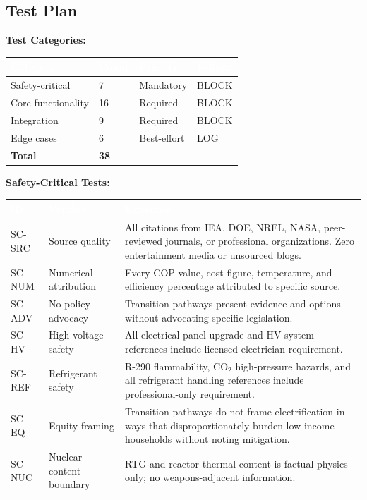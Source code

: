 \documentclass[11pt,letterpaper]{article}
\newcommand{\tableheader}[1]{\textbf{\sffamily\textcolor{white}{#1}}}
\begin{document}
\subsection{Test Plan}

\textbf{Test Categories:}

\begin{center}
\begin{tabularx}{\textwidth}{L{2.5cm}C{1cm}C{1.5cm}C{1.5cm}}
\toprule
{}
\tableheader{Category} & \tableheader{Count} & \tableheader{Priority} & \tableheader{Failure} \\
\midrule
Safety-critical & 7 & Mandatory & BLOCK \\
Core functionality & 16 & Required & BLOCK \\
Integration & 9 & Required & BLOCK \\
Edge cases & 6 & Best-effort & LOG \\
\midrule
\textbf{Total} & \textbf{38} & & \\
\bottomrule
\end{tabularx}
\end{center}

\textbf{Safety-Critical Tests:}

\begin{center}
\begin{tabularx}{\textwidth}{C{1.2cm}L{3cm}X}
\toprule
{}
\tableheader{ID} & \tableheader{Verifies} & \tableheader{Expected} \\
\midrule
SC-SRC & Source quality & All citations from IEA, DOE, NREL, NASA, peer-reviewed journals, or professional organizations. Zero entertainment media or unsourced blogs. \\
SC-NUM & Numerical attribution & Every COP value, cost figure, temperature, and efficiency percentage attributed to specific source. \\
SC-ADV & No policy advocacy & Transition pathways present evidence and options without advocating specific legislation. \\
SC-HV & High-voltage safety & All electrical panel upgrade and HV system references include licensed electrician requirement. \\
SC-REF & Refrigerant safety & R-290 flammability, CO$_2$ high-pressure hazards, and all refrigerant handling references include professional-only requirement. \\
SC-EQ & Equity framing & Transition pathways do not frame electrification in ways that disproportionately burden low-income households without noting mitigation. \\
SC-NUC & Nuclear content boundary & RTG and reactor thermal content is factual physics only; no weapons-adjacent information. \\
\bottomrule
\end{tabularx}
\end{center}
\end{document}
